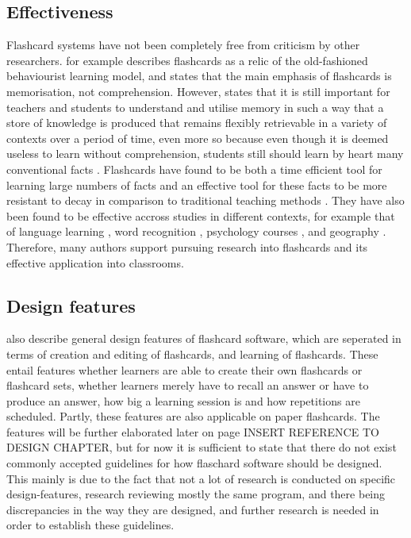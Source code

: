 \subsection{Effectiveness}

Flashcard systems have not been completely free from criticism by other researchers.  for example describes flashcards as a relic of the old-fashioned behaviourist learning model, and  states that the main emphasis of flashcards is memorisation, not comprehension. However,  states that it is still important for teachers and students to understand and utilise memory in such a way that a store of knowledge is produced that remains flexibly retrievable in a variety of contexts over a period of time, even more so because even though it is deemed useless to learn without comprehension, students still should learn by heart many conventional facts \cite{glaserfield}. Flashcards have found to be both a time efficient tool for learning large numbers of facts and an effective tool for these facts to be more resistant to decay in comparison to traditional teaching methods \cite{nakata}. They have also been found to be effective accross studies in different contexts, for example that of language learning \cite{chien, nakata, macquarrie, mccullough}, word recognition \cite{joseph}, psychology courses \cite{burgess, golding}, and geography \cite{zirkle}. Therefore, many authors support pursuing research into flashcards and its effective application into classrooms.

\subsection{Design features}

 also describe general design features of flashcard software, which are seperated in terms of creation and editing of flashcards, and learning of flashcards. These entail features whether learners are able to create their own flashcards or flashcard sets, whether learners merely have to recall an answer or have to produce an answer, how big a learning session is and how repetitions are scheduled. Partly, these features are also applicable on paper flashcards. The features will be further elaborated later on page INSERT REFERENCE TO DESIGN CHAPTER, but for now it is sufficient to state that there do not exist commonly accepted guidelines for how flaschard software should be designed. This mainly is due to the fact that not a lot of research is conducted on specific design-features, research reviewing mostly the same program, and there being discrepancies in the way they are designed, and further research is needed in order to establish these guidelines.


